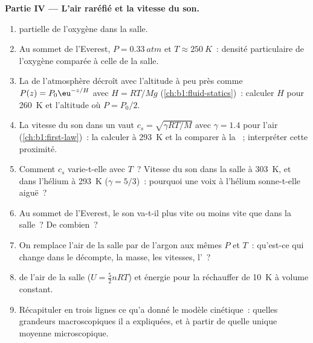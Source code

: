 \begin{problem}
\medskip
\noindent\textbf{Partie IV --- L'air raréfié et la vitesse du son.}
\begin{enumerate}[resume]
  \item {} partielle de l'oxygène dans la salle.
  \item Au sommet de l'Everest, $P = \qty{0.33}{atm}$ et $T \approx \qty{250}{K}$~:
        densité particulaire de l'oxygène comparée à celle de la salle.
  \item La  de l'atmosphère décroît avec l'altitude à peu près
        comme $P(z) = P_0\eu^{-z/H}$ avec $H = RT/Mg$ (\cref{ch:b1:fluid-statics})~:
        calculer $H$ pour \qty{260}{K} et l'altitude où $P = P_0/2$.
  \item La vitesse du son dans un  vaut $c_s = \sqrt{\gamma RT/M}$
        avec $\gamma = 1.4$ pour l'air (\cref{ch:b1:first-law})~: la
        calculer à \qty{293}{K} et la comparer à la ~; interpréter cette proximité.
  \item Comment $c_s$ varie-t-elle avec $T$~? Vitesse du son dans la
        salle à \qty{303}{K}, et dans l'hélium à \qty{293}{K}
        ($\gamma = 5/3$)~: pourquoi une voix à l'hélium sonne-t-elle aiguë~?
  \item Au sommet de l'Everest, le son va-t-il plus vite ou moins vite
        que dans la salle~? De combien~?
  \item On remplace l'air de la salle par de l'argon aux mêmes $P$ et
        $T$~: qu'est-ce qui change dans le décompte, la masse, les
        vitesses, l'~?
  \item {} de l'air de la salle ($U = \tfrac52 nRT$) et
        énergie pour la réchauffer de \qty{10}{K} à volume constant.
  \item Récapituler en trois lignes ce qu'a donné le modèle cinétique~:
        quelles grandeurs macroscopiques il a expliquées, et à partir de
        quelle unique moyenne microscopique.
\end{enumerate}
\end{problem}
